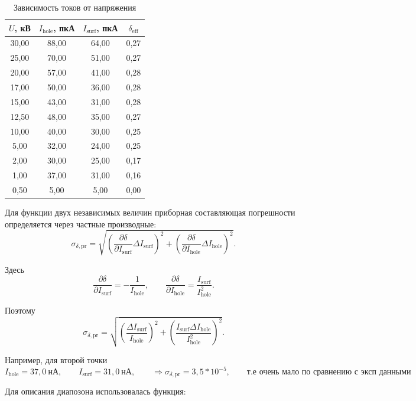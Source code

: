 \documentclass[12pt]{article}
\begin{document}
\begin{table}[h]
\centering
\caption{Зависимость токов от напряжения}
\label{tab:currents_voltage}
\begin{tabular}{|c|c|c|c|}
\hline
$U$, кВ & $I_{\text{hole}}$, пкА & $I_{\text{surf}}$, пкА & $\delta_{\text{eff}}$ \\
\hline
30{,}00 & 88{,}00 & 64{,}00 & 0{,}27 \\
25{,}00 & 70{,}00 & 51{,}00 & 0{,}27 \\
20{,}00 & 57{,}00 & 41{,}00 & 0{,}28 \\
17{,}00 & 50{,}00 & 36{,}00 & 0{,}28 \\
15{,}00 & 43{,}00 & 31{,}00 & 0{,}28 \\
12{,}50 & 48{,}00 & 35{,}00 & 0{,}27 \\
10{,}00 & 40{,}00 & 30{,}00 & 0{,}25 \\
5{,}00  & 32{,}00 & 24{,}00 & 0{,}25 \\
2{,}00  & 30{,}00 & 25{,}00 & 0{,}17 \\
1{,}00  & 37{,}00 & 31{,}00 & 0{,}16 \\
0{,}50  & 5{,}00  & 5{,}00  & 0{,}00 \\
\hline
\end{tabular}
\end{table}

Для функции двух независимых величин приборная составляющая погрешности определяется через частные производные:
\[
\sigma_{\delta,\mathrm{pr}} = \sqrt{ \left( \frac{\partial \delta}{\partial I_{\mathrm{surf}}} \Delta I_{\mathrm{surf}} \right)^2 + \left( \frac{\partial \delta}{\partial I_{\mathrm{hole}}} \Delta I_{\mathrm{hole}} \right)^2 }.
\]

Здесь
\[
\frac{\partial \delta}{\partial I_{\mathrm{surf}}} = -\frac{1}{I_{\mathrm{hole}}}, \qquad \frac{\partial \delta}{\partial I_{\mathrm{hole}}} = \frac{I_{\mathrm{surf}}}{I_{\mathrm{hole}}^2}.
\]

Поэтому
\[
\sigma_{\delta,\mathrm{pr}} = \sqrt{ \left( \frac{\Delta I_{\mathrm{surf}}}{I_{\mathrm{hole}}} \right)^2 + \left( \frac{I_{\mathrm{surf}} \Delta I_{\mathrm{hole}}}{I_{\mathrm{hole}}^2} \right)^2 }.
\]

Например, для второй точки
\[
I_{\mathrm{hole}} = 37{,}0~\text{нА}, \qquad I_{\mathrm{surf}} = 31{,}0~\text{нА},\qquad \Rightarrow \sigma_{\delta,\mathrm{pr}} = 3,5 * 10^{-5},\qquad \text{т.е очень мало по сравнению с эксп данными}
\]

\newpage

Для описания диапозона использовалась функция: 
\end{document}
